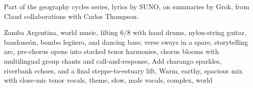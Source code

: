 
\begin{notes}
Part of the geography cycles series, lyrics by SUNO, on summaries by Grok, from Claud collaborations with Carlos Thompson.
\end{notes}
\begin{style}
Zamba Argentina, world music, lilting 6/8 with hand drums, nylon-string guitar, bandoneón, bombo legüero, and dancing bass; verse sways in a spare, storytelling arc, pre-chorus opens into stacked tenor harmonies, chorus blooms with multilingual group chants and call-and-response, Add charango sparkles, riverbank echoes, and a final steppe-to-estuary lift, Warm, earthy, spacious mix with close-mic tenor vocals, theme, slow, male vocals, complex, world
\end{style}
